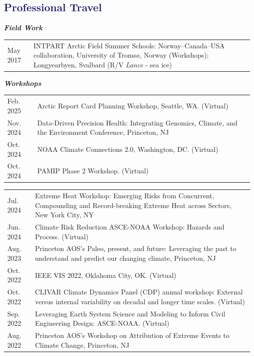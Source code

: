\documentclass[margin,line,palatino,courier,10pt]{res}
\begin{document}
\begin{resume}
\section{\sc \textcolor{MidnightBlue}{\large{\textbf{Professional Travel}}}}
\textit{\textbf{Field Work}}
\vspace*{0.05in}\\
\begin{tabular}{@{}p{0.9in}p{4in}}
May 2017 & INTPART Arctic Field Summer Schools: Norway--Canada--USA collaboration, University of Troms\o, Norway (Workshops); Longyearbyen, Svalbard (R/V \textit{Lance} - sea ice)
\end{tabular}

\textit{\textbf{Workshops}}
\vspace*{0.05in}\\
\begin{tabular}{@{}p{0.9in}p{4in}}
Feb. 2025 & Arctic Report Card Planning Workshop, Seattle, WA. (Virtual)\\
Nov. 2024 & Data-Driven Precision Health: Integrating Genomics, Climate, and the Environment Conference, Princeton, NJ\\
Oct. 2024 & NOAA Climate Connections 2.0, Washington, DC. (Virtual)\\
Oct. 2024 & PAMIP Phase 2 Workshop. (Virtual)\\
\end{tabular}
\begin{tabular}{@{}p{0.9in}p{4in}}
Jul. 2024 & Extreme Heat Workshop: Emerging Risks from Concurrent, Compounding and Record-breaking Extreme Heat across Sectors, New York City, NY\\
Jun. 2024 & Climate Risk Reduction ASCE-NOAA Workshop: Hazards and Process. (Virtual)\\
Aug. 2023 & Princeton AOS's Paleo, present, and future: Leveraging the past to understand and predict our changing climate, Princeton, NJ\\
Oct. 2022 & IEEE VIS 2022, Oklahoma City, OK. (Virtual)\\
Oct. 2022 & CLIVAR Climate Dynamics Panel (CDP) annual workshop: External versus internal variability on decadal and longer time scales. (Virtual)\\
Sep. 2022 & Leveraging Earth System Science and Modeling to Inform Civil Engineering Design: ASCE-NOAA. (Virtual)\\
Aug. 2022 & Princeton AOS's Workshop on Attribution of Extreme Events to Climate Change, Princeton, NJ\\

\end{tabular}
\end{resume}
\end{document}

